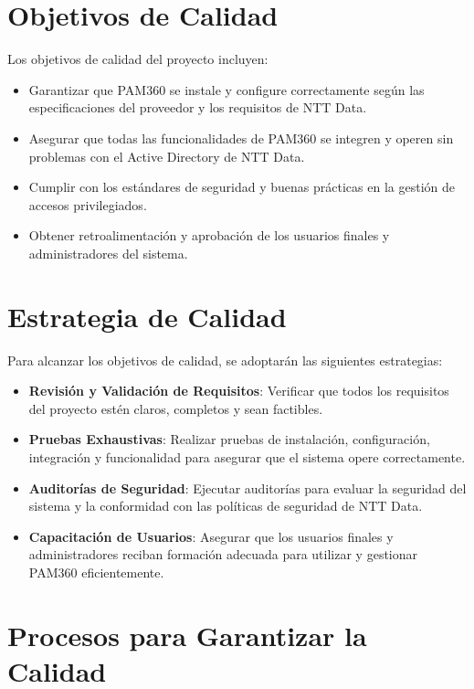 \section{Objetivos de Calidad}

Los objetivos de calidad del proyecto incluyen:

\begin{itemize}
	\item Garantizar que PAM360 se instale y configure correctamente según las especificaciones del proveedor y los requisitos de NTT Data.
	\item Asegurar que todas las funcionalidades de PAM360 se integren y operen sin problemas con el Active Directory de NTT Data.
	\item Cumplir con los estándares de seguridad y buenas prácticas en la gestión de accesos privilegiados.
	\item Obtener retroalimentación y aprobación de los usuarios finales y administradores del sistema.
\end{itemize}

\section{Estrategia de Calidad}

Para alcanzar los objetivos de calidad, se adoptarán las siguientes estrategias:

\begin{itemize}
	\item \textbf{Revisión y Validación de Requisitos}: Verificar que todos los requisitos del proyecto estén claros, completos y sean factibles.
	\item \textbf{Pruebas Exhaustivas}: Realizar pruebas de instalación, configuración, integración y funcionalidad para asegurar que el sistema opere correctamente.
	\item \textbf{Auditorías de Seguridad}: Ejecutar auditorías para evaluar la seguridad del sistema y la conformidad con las políticas de seguridad de NTT Data.
	\item \textbf{Capacitación de Usuarios}: Asegurar que los usuarios finales y administradores reciban formación adecuada para utilizar y gestionar PAM360 eficientemente.
\end{itemize}

\section{Procesos para Garantizar la Calidad}

